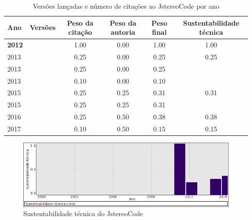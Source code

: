 \begin{table}[H]
\caption{Versões lançadas e número de citações ao JstereoCode por ano}
\centering
\begin{tabular}{| l | c | c | c | c | c |}
  \hline
  Ano & Versões & Peso da citação & Peso da autoria & Peso final & Sustentabilidade técnica \\
  \hline
            {\bf 2012}
          &
          
          &
          1.00
          &
          0.00
          &
          1.00
          &
            {\color{blue} 1.00}
          \\
\hline
            2013
          &
          
          &
          0.25
          &
          0.00
          &
          0.25
          &
            {\color{red} 0.25}
          \\
            2013
          &
          
          &
          0.25
          &
          0.00
          &
          0.25
          &
          \\
            2013
          &
          
          &
          0.10
          &
          0.00
          &
          0.10
          &
          \\
\hline
            2015
          &
          
          &
          0.25
          &
          0.25
          &
          0.31
          &
            {\color{red} 0.31}
          \\
            2015
          &
          
          &
          0.25
          &
          0.25
          &
          0.31
          &
          \\
\hline
            2016
          &
          
          &
          0.25
          &
          0.50
          &
          0.38
          &
            {\color{red} 0.38}
          \\
\hline
            2017
          &
          
          &
          0.10
          &
          0.50
          &
          0.15
          &
            {\color{red} 0.15}
          \\
\hline
\end{tabular}
\end{table}

\begin{figure}[h]
  \center
  \includegraphics[scale=0.50]{imagens/softwares-charts/jstereocode.png}
  \caption{Sustentabilidade técnica do JstereoCode}
\end{figure}


